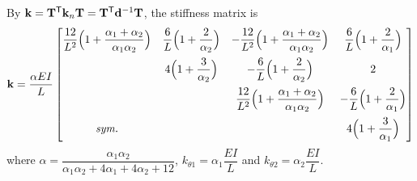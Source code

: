 \begin{example}
By $\mathbf{k} = \mathbf{T}^{\mathsf{T}}\mathbf{k}_n\mathbf{T} = \mathbf{T}^{\mathsf{T}}\mathbf{d}^{-1}\mathbf{T}$, the stiffness matrix is
\begin{equation*}
  \mathbf{k} = \frac{\alpha EI}{L}
  \begin{bmatrix}
    \dfrac{12}{L^2}\Bigl(1+\dfrac{\alpha_1+\alpha_2}{\alpha_1\alpha_2}\Bigr) & \dfrac6L\Bigl(1+\dfrac{2}{\alpha_2}\Bigr) & -\dfrac{12}{L^2}\Bigl(1+\dfrac{\alpha_1+\alpha_2}{\alpha_1\alpha_2}\Bigr) & \dfrac6L\Bigl(1+\dfrac{2}{\alpha_1}\Bigr)\\[10pt]
    & 4\Bigl(1+\dfrac{3}{\alpha_2}\Bigr) & -\dfrac6L\Bigl(1+\dfrac{2}{\alpha_2}\Bigr) & 2\\[10pt]
    & & \dfrac{12}{L^2}\Bigl(1+\dfrac{\alpha_1+\alpha_2}{\alpha_1\alpha_2}\Bigr) & -\dfrac6L\Bigl(1+\dfrac{2}{\alpha_1}\Bigr)\\[10pt]
    \textit{sym.} & & & 4\Bigl(1+\dfrac{3}{\alpha_1}\Bigr)
  \end{bmatrix}
\end{equation*}
where $\alpha = \dfrac{\alpha_1\alpha_2}{\alpha_1\alpha_2 + 4\alpha_1 + 4\alpha_2 + 12}$, $k_{\theta1} = \alpha_1\dfrac{EI}{L}$ and $k_{\theta2} = \alpha_2\dfrac{EI}{L}$.


\end{example}
